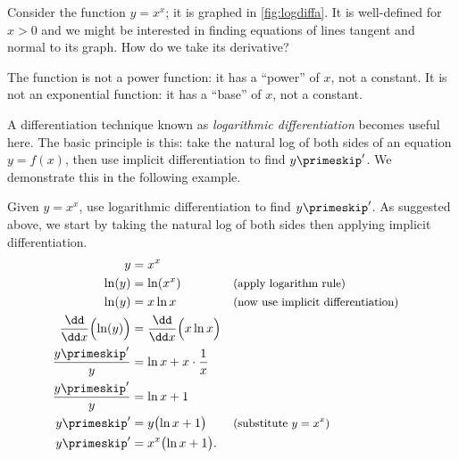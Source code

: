 Consider the function $y=x^x$; it is graphed in \autoref{fig:logdiffa}. It is well-defined for $x>0$ and we might be interested in finding equations of lines tangent and normal to its graph. How do we take its derivative?

The function is not a power function: it has a ``power'' of $x$, not a constant. It is not an exponential function: it has a ``base'' of $x$, not a constant. 

A differentiation technique known as \emph{logarithmic differentiation} becomes useful here. The basic principle is this: take the natural log of both sides of an equation $y=f(x)$, then use implicit differentiation to find $y\primeskip'$. We demonstrate this in the following example.

\begin{example}\label{ex_implicit10}%
Given $y=x^x$, use logarithmic differentiation to find $y\primeskip'$.
\solution
As suggested above, we start by taking the natural log of both sides then applying implicit differentiation.
\begin{align*}
y &= x^x \\
\ln (y) &= \ln (x^x) && \text{\small (apply logarithm rule)}\\
\ln (y) &= x\ln x && \text{\small (now use implicit differentiation)}\\
\frac{\dd}{\dd x}\Bigl(\ln (y)\Bigr) &= \frac{\dd}{\dd x}\Bigl(x\ln x\Bigr) \\
\frac{y\primeskip'}{y} &= \ln x + x\cdot\frac1x\\
\frac{y\primeskip'}{y} &= \ln x + 1\\
y\primeskip'
&= y\bigl(\ln x+1\bigr) && \text{\small (substitute $y=x^x$)}\\
y\primeskip' &= x^x\bigl(\ln x+1\bigr).
\end{align*} 



\end{example}
